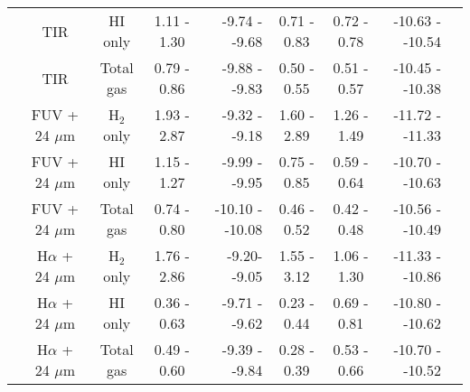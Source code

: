 \documentclass[useAMS,usenatbib]{mn2e}
\begin{document}
\begin{table*}
\begin{tabular}{ccccrccrr}
 & TIR               & HI only    & 1.11 - 1.30 & -9.74 - -9.68  & 0.71 - 0.83    & 0.72 - 0.78    & -10.63 - -10.54     \\
 & TIR               & Total gas  & 0.79 - 0.86 &  -9.88 - -9.83  & 0.50 - 0.55    & 0.51 - 0.57    & -10.45 - -10.38     \\
 & FUV + 24 $\mu$m       & H$_2$ only & 1.93 - 2.87 & -9.32 - -9.18  & 1.60 - 2.89    & 1.26 - 1.49& -11.72 - -11.33     \\
 & FUV + 24 $\mu$m       & HI only    & 1.15 - 1.27 & -9.99 - -9.95  & 0.75 - 0.85    & 0.59 - 0.64    & -10.70 - -10.63     \\
 & FUV + 24 $\mu$m       & Total gas  & 0.74 - 0.80 & -10.10 - -10.08 & 0.46 - 0.52    & 0.42 - 0.48    & -10.56 - -10.49     \\
 & H$\alpha$ + 24 $\mu$m & H$_2$ only & 1.76 - 2.86 & -9.20- -9.05  & 1.55 - 3.12    & 1.06 - 1.30    & -11.33 - -10.86     \\
 & H$\alpha$ + 24 $\mu$m & HI only    & 0.36 - 0.63 &  -9.71 - -9.62  & 0.23 - 0.44    & 0.69 - 0.81    & -10.80 - -10.62     \\
 & H$\alpha$ + 24 $\mu$m & Total gas  & 0.49 - 0.60 & -9.39 - -9.84  & 0.28 - 0.39    & 0.53 - 0.66    & -10.70 - -10.52     \\
 \hline
\end{tabular}
\end{table*}
\end{document}
